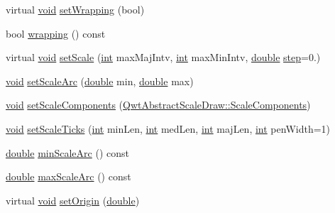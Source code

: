 \begin{DoxyCompactItemize}
virtual \hyperlink{group___u_a_v_objects_plugin_ga444cf2ff3f0ecbe028adce838d373f5c}{void} \hyperlink{class_qwt_dial_a8d2cfa17acf266fd0273f0f477895499}{set\-Wrapping} (bool)
\item 
bool \hyperlink{class_qwt_dial_a13936ddfd1e381267b2ccafa4806d0fa}{wrapping} () const 
\item 
virtual \hyperlink{group___u_a_v_objects_plugin_ga444cf2ff3f0ecbe028adce838d373f5c}{void} \hyperlink{class_qwt_dial_aec2d13245d2120c0b4b2d6ae1f52cf4f}{set\-Scale} (\hyperlink{ioapi_8h_a787fa3cf048117ba7123753c1e74fcd6}{int} max\-Maj\-Intv, \hyperlink{ioapi_8h_a787fa3cf048117ba7123753c1e74fcd6}{int} max\-Min\-Intv, \hyperlink{_super_l_u_support_8h_a8956b2b9f49bf918deed98379d159ca7}{double} \hyperlink{class_qwt_double_range_a0cb8cc60548c10cb1d98e54387961967}{step}=0.)
\item 
\hyperlink{group___u_a_v_objects_plugin_ga444cf2ff3f0ecbe028adce838d373f5c}{void} \hyperlink{class_qwt_dial_a8abc41e15c62017d3c3ffb98acb9677f}{set\-Scale\-Arc} (\hyperlink{_super_l_u_support_8h_a8956b2b9f49bf918deed98379d159ca7}{double} min, \hyperlink{_super_l_u_support_8h_a8956b2b9f49bf918deed98379d159ca7}{double} max)
\item 
\hyperlink{group___u_a_v_objects_plugin_ga444cf2ff3f0ecbe028adce838d373f5c}{void} \hyperlink{class_qwt_dial_a59774f8332b30c535b70ca24f2db76f9}{set\-Scale\-Components} (\hyperlink{class_qwt_abstract_scale_draw_a0dd3ccdfa074fb6b1781b84ed2a4729a}{Qwt\-Abstract\-Scale\-Draw\-::\-Scale\-Components})
\item 
\hyperlink{group___u_a_v_objects_plugin_ga444cf2ff3f0ecbe028adce838d373f5c}{void} \hyperlink{class_qwt_dial_a84e9b1cd296bf77788e2785f74e5be70}{set\-Scale\-Ticks} (\hyperlink{ioapi_8h_a787fa3cf048117ba7123753c1e74fcd6}{int} min\-Len, \hyperlink{ioapi_8h_a787fa3cf048117ba7123753c1e74fcd6}{int} med\-Len, \hyperlink{ioapi_8h_a787fa3cf048117ba7123753c1e74fcd6}{int} maj\-Len, \hyperlink{ioapi_8h_a787fa3cf048117ba7123753c1e74fcd6}{int} pen\-Width=1)
\item 
\hyperlink{_super_l_u_support_8h_a8956b2b9f49bf918deed98379d159ca7}{double} \hyperlink{class_qwt_dial_a1725682984aff88ef891966225c06030}{min\-Scale\-Arc} () const 
\item 
\hyperlink{_super_l_u_support_8h_a8956b2b9f49bf918deed98379d159ca7}{double} \hyperlink{class_qwt_dial_a9d7a976894700e616126d41a312f999d}{max\-Scale\-Arc} () const 
\item 
virtual \hyperlink{group___u_a_v_objects_plugin_ga444cf2ff3f0ecbe028adce838d373f5c}{void} \hyperlink{class_qwt_dial_a3f64c6fbac747f735e57c2073e93bc50}{set\-Origin} (\hyperlink{_super_l_u_support_8h_a8956b2b9f49bf918deed98379d159ca7}{double})

\end{DoxyCompactItemize}
